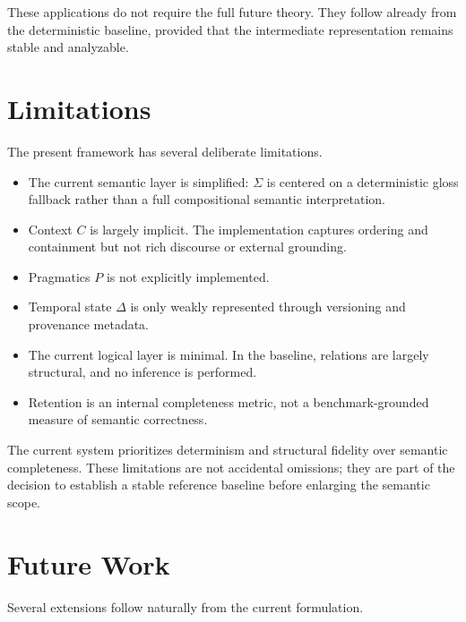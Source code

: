 \documentclass{article}
\begin{document}
These applications do not require the full future theory. They follow already from the deterministic baseline, provided that the intermediate representation remains stable and analyzable.

\section{Limitations}

The present framework has several deliberate limitations.

\begin{itemize}
\item The current semantic layer is simplified: \(\Sigma\) is centered on a deterministic gloss fallback rather than a full compositional semantic interpretation.
\item Context \(C\) is largely implicit. The implementation captures ordering and containment but not rich discourse or external grounding.
\item Pragmatics \(P\) is not explicitly implemented.
\item Temporal state \(\Delta\) is only weakly represented through versioning and provenance metadata.
\item The current logical layer is minimal. In the baseline, relations are largely structural, and no inference is performed.
\item Retention is an internal completeness metric, not a benchmark-grounded measure of semantic correctness.
\end{itemize}

The current system prioritizes determinism and structural fidelity over semantic completeness. These limitations are not accidental omissions; they are part of the decision to establish a stable reference baseline before enlarging the semantic scope.

\section{Future Work}

Several extensions follow naturally from the current formulation.
\end{document}
